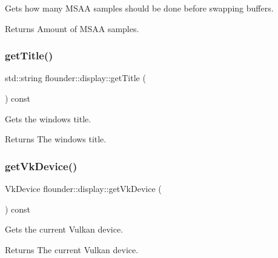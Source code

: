 Gets how many M\+S\+AA samples should be done before swapping buffers. 

\begin{DoxyReturn}{Returns}
Amount of M\+S\+AA samples. 
\end{DoxyReturn}
\mbox{\label{classflounder_1_1display_ae472af54213c5e5d373ec4f97bbe67aa}} 
\subsubsection{\texorpdfstring{get\+Title()}{getTitle()}}
{\footnotesize\ttfamily std\+::string flounder\+::display\+::get\+Title (\begin{DoxyParamCaption}{ }\end{DoxyParamCaption}) const\hspace{0.3cm}{\ttfamily [inline]}}



Gets the window\textquotesingle{}s title. 

\begin{DoxyReturn}{Returns}
The window\textquotesingle{}s title. 
\end{DoxyReturn}
\mbox{\label{classflounder_1_1display_a6b6c7b12c56ae915cb2d06c77e9b6ba8}} 
\subsubsection{\texorpdfstring{get\+Vk\+Device()}{getVkDevice()}}
{\footnotesize\ttfamily Vk\+Device flounder\+::display\+::get\+Vk\+Device (\begin{DoxyParamCaption}{ }\end{DoxyParamCaption}) const\hspace{0.3cm}{\ttfamily [inline]}}



Gets the current Vulkan device. 

\begin{DoxyReturn}{Returns}
The current Vulkan device. 
\end{DoxyReturn}
\mbox{\label{classflounder_1_1display_a444c592ab06252c53b4600b2146f99f8}} 
